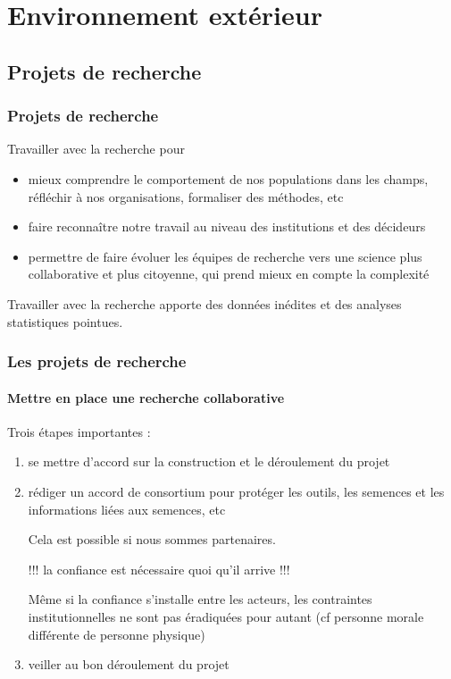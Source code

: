 \section{Environnement extérieur} \begin{frame}\small\tableofcontents[currentsection,currentsubsection,subsectionstyle=show/show/hide]\end{frame}

\subsection{Projets de recherche}

\begin{frame}
\frametitle{Projets de recherche}

Travailler avec la recherche pour
\begin{itemize}
\item mieux comprendre le comportement de nos populations dans les champs, réfléchir à nos organisations, formaliser des méthodes, etc
\item faire reconnaître notre travail au niveau des institutions et des décideurs
\item permettre de faire évoluer les équipes de recherche vers une science plus collaborative et plus citoyenne, qui prend mieux en compte la complexité
\end{itemize}

\begin{block}{}
Travailler avec la recherche apporte des données inédites et des analyses statistiques pointues.
\end{block}

\end{frame}


\begin{frame}
\frametitle{Les projets de recherche}
\framesubtitle{Mettre en place une recherche collaborative}

Trois étapes importantes :

\begin{enumerate}
\item se mettre d'accord sur la construction et le déroulement du projet
\item rédiger un accord de consortium pour protéger les outils, les semences et les informations liées aux semences, etc
\begin{block}{}
\centering
Cela est possible si nous sommes partenaires.

!!! la confiance est nécessaire quoi qu'il arrive !!!
\end{block}

Même si la confiance s'installe entre les acteurs, les contraintes institutionnelles ne sont pas éradiquées pour autant (cf personne morale différente de personne physique)

\item veiller au bon déroulement du projet

\end{enumerate}

\end{frame}

